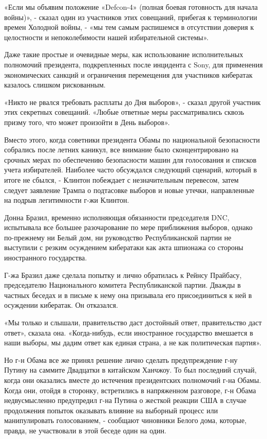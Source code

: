 «Если мы объявим положение «Defcon-4» (полная боевая готовность для
начала войны)», - сказал один из участников этих совещаний, прибегая к
терминологии времен Холодной войны, - «мы тем самым распишемся в
отсутствии доверия к целостности и непоколебимости нашей избирательной
системы».

Даже такие простые и очевидные меры, как использование исполнительных
полномочий президента, подкрепленных после инцидента с Sony, для
применения экономических санкций и ограничения перемещения для
участников кибератак казалось слишком рискованным.

«Никто не рвался требовать расплаты до Дня выборов», - сказал другой
участник этих секретных совещаний. «Любые ответные меры рассматривались
сквозь призму того, что может произойти в День выборов».

Вместо этого, когда советники президента Обамы по национальной
безопасности собрались после летних каникул, все внимание было
сконцентрировано на срочных мерах по обеспечению безопасности машин для
голосования и списков учета избирателей. Наиболее часто обсуждался
следующий сценарий, который в итоге не сбылся, - Клинтон побеждает с
незначительным перевесом, затем следует заявление Трампа о подтасовке
выборов и новые утечки, направленные на подрыв легитимности г-жи
Клинтон.

Донна Бразил, временно исполняющая обязанности председателя DNC,
испытывала все большее разочарование по мере приближения выборов, однако
по-прежнему ни Белый дом, ни руководство Республиканской партии не
выступили с резким осуждением кибератаки как акта шпионажа со стороны
иностранного государства.

Г-жа Бразил даже сделала попытку и лично обратилась к Рейнсу Прайбасу,
председателю Национального комитета Республиканской партии. Дважды в
частных беседах и в письме к нему она призывала его присоединиться к ней
в осуждении кибератак. Он отказался.

«Мы только и слышали, правительство даст достойный ответ, правительство
даст ответ», сказала она. «Когда-нибудь, если иностранное государство
вмешается в наши выборы, мы дадим ответ как единая страна, а не как
политическая партия».

Но г-н Обама все же принял решение лично сделать предупреждение г-ну
Путину на саммите Двадцатки в китайском Ханчжоу. То был последний
случай, когда они оказались вместе до истечения президентских полномочий
г-на Обамы. Когда они, отойдя в сторонку, встретились в напряженном
разговоре, г-н Обама недвусмысленно предупредил г-на Путина о жесткой
реакции США в случае продолжения попыток оказывать влияние на выборный
процесс или манипулировать голосованием, - сообщают чиновники Белого
дома, которые, правда, не участвовали в этой беседе один на один.

